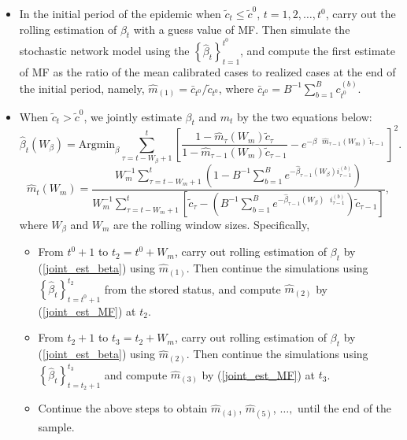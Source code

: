 \documentclass[12pt]{article}
\begin{document}
\begin{itemize}
\item In the initial period of the epidemic when $\tilde{c}_{t}\leq\tilde
{c}^{0}$, $t=1,2,\ldots,t^{0}$, carry out the rolling estimation of $\beta
_{t}$ with a guess value of MF. Then simulate the stochastic network model
using the $\left\{  \hat{\beta}_{t}\right\}  _{t=1}^{t^{0}}$, and compute the
first estimate of MF as the ratio of the mean calibrated cases to realized
cases at the end of the initial period, namely, $\hat{m}_{\left(  1\right)
}=\bar{c}_{t^{0}}/\tilde{c}_{t^{0}}$, where $\bar{c}_{t^{0}}=B^{-1}\sum
_{b=1}^{B}c_{t^{0}}^{\left(  b\right)  }.$

\item When $\tilde{c}_{t}>\tilde{c}^{0}$, we jointly estimate $\beta_{t}$ and
$m_{t}$ by the two equations below:%
\begin{equation}
\hat{\beta}_{t}\left(  W_{\beta}\right)  =\text{Argmin}_{\beta}\sum
_{\tau=t-W_{\beta}+1}^{t}\left[  \frac{1-\hat{m}_{\tau}(W_{m})\tilde{c}_{\tau
}}{1-\hat{m}_{\tau-1}(W_{m})\tilde{c}_{\tau-1}}-e^{-\beta\text{ }\hat{m}%
_{\tau-1}(W_{m})\tilde{\imath}_{\tau-1}}\right]  ^{2}. \label{joint_est_beta}%
\end{equation}%
\begin{equation}
\hat{m}_{t}(W_{m})=\frac{W_{m}^{-1}\sum_{\tau=t-W_{m}+1}^{t}\left(
1-B^{-1}\sum_{b=1}^{B}e^{-\hat{\beta}_{\tau-1}\left(  W_{\beta}\right)  \text{
}i_{\tau-1}^{\left(  b\right)  }}\right)  }{W_{m}^{-1}\sum_{\tau=t-W_{m}%
+1}^{t}\left[  \tilde{c}_{\tau}-\left(  B^{-1}\sum_{b=1}^{B}e^{-\hat{\beta
}_{\tau-1}\left(  W_{\beta}\right)  \text{ }i_{\tau-1}^{\left(  b\right)  }%
}\right)  \tilde{c}_{\tau-1}\right]  }, \label{joint_est_MF}%
\end{equation}
where $W_{\beta}$ and $W_{m}$ are the rolling window sizes. Specifically,

\begin{itemize}
\item From $t^{0}+1$ to $t_{2}=t^{0}+W_{m}$, carry out rolling estimation of
$\beta_{t}$ by (\ref{joint_est_beta}) using $\hat{m}_{\left(  1\right)  }$.
Then continue the simulations using $\left\{  \hat{\beta}_{t}\right\}
_{t=t^{0}+1}^{t_{2}}$ from the stored status, and compute $\hat{m}_{\left(
2\right)  }$ by (\ref{joint_est_MF}) at $t_{2}$.

\item From $t_{2}+1$ to $t_{3}=t_{2}+W_{m}$, carry out rolling estimation of
$\beta_{t}$ by (\ref{joint_est_beta}) using $\hat{m}_{\left(  2\right)  }$.
Then continue the simulations using $\left\{  \hat{\beta}_{t}\right\}
_{t=t_{2}+1}^{t_{3}}$ and compute $\hat{m}_{\left(  3\right)  }$ by
(\ref{joint_est_MF}) at $t_{3}$.

\item Continue the above steps to obtain $\hat{m}_{\left(  4\right)  }$,
$\hat{m}_{\left(  5\right)  }$, $\ldots,$ until the end of the sample.
\end{itemize}
\end{itemize}
\end{document}
